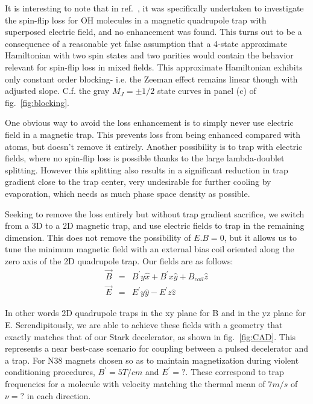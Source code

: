\documentclass[%
 reprint,
 amsmath,amssymb,
 aps,
prl,
]{revtex4-1}
\begin{document}
It is interesting to note that in ref.~\cite{Lara2008}, it was specifically undertaken to investigate the spin-flip loss for OH molecules in a magnetic quadrupole trap with superposed electric field, and no enhancement was found. This turns out to be a consequence of a reasonable yet false assumption that a 4-state approximate Hamiltonian with two spin states and two parities would contain the behavior relevant for spin-flip loss in mixed fields. This approximate Hamiltonian exhibits only constant order blocking- i.e. the Zeeman effect remains linear though with adjusted slope. C.f. the gray $M_J=\pm1/2$ state curves in panel (c) of fig.~\ref{fig:blocking}.



One obvious way to avoid the loss enhancement is to simply never use electric field in a magnetic trap. This prevents loss from being enhanced compared with atoms, but doesn't remove it entirely. Another possibility is to trap with electric fields, where no spin-flip loss is possible thanks to the large lambda-doublet splitting. However this splitting also results in a significant reduction in trap gradient close to the trap center, very undesirable for further cooling by evaporation, which needs as much phase space density as possible.


Seeking to remove the loss entirely but without trap gradient sacrifice, we switch from a 3D to a 2D magnetic trap, and use electric fields to trap in the remaining dimension. This does not remove the possibility of $E.B=0$, but it allows us to tune the minimum magnetic field with an external bias coil oriented along the zero axis of the 2D quadrupole trap.  Our fields are as follows:
\begin{eqnarray}
\vec{B} &=&  B^\prime y\hat{x}+ B^\prime x\hat{y} + B_{coil} \hat{z}\\
\vec{E} &=&  E^\prime y\hat{y}-  E^\prime z\hat{z}
\end{eqnarray}

\noindent In other words 2D quadrupole traps in the xy plane for B and in the yz plane for E. Serendipitously, we are able to achieve these fields with a geometry that exactly matches that of our Stark decelerator, as shown in fig.~\ref{fig:CAD}. This represents a near best-case scenario for coupling between a pulsed decelerator and a trap. For N38 magnets chosen so as to maintain magnetization during violent conditioning procedures, $B^\prime=5 T/cm$ and $E^\prime=?$. These correspond to trap frequencies for a molecule with velocity matching the thermal mean of $7m/s$ of $\nu=?$ in each direction.
\end{document}
